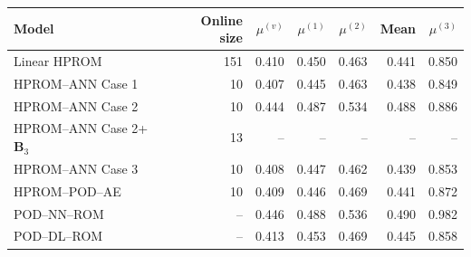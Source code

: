 \begin{tabular}{lr|rrrr|r}
\toprule
Model & Online size & $\mu^{(v)}$ & $\mu^{(1)}$ & $\mu^{(2)}$ & Mean & $\mu^{(3)}$ \\
\midrule
Linear HPROM & 151 & 0.410 & 0.450 & 0.463 & 0.441 & 0.850 \\
HPROM--ANN Case 1 & 10 & 0.407 & 0.445 & 0.463 & 0.438 & 0.849 \\
HPROM--ANN Case 2 & 10 & 0.444 & 0.487 & 0.534 & 0.488 & 0.886 \\
HPROM--ANN Case 2+$\mathbf B_3$ & 13 & -- & -- & -- & -- & -- \\
HPROM--ANN Case 3 & 10 & 0.408 & 0.447 & 0.462 & 0.439 & 0.853 \\
HPROM--POD--AE & 10 & 0.409 & 0.446 & 0.469 & 0.441 & 0.872 \\
\midrule
POD--NN--ROM & -- & 0.446 & 0.488 & 0.536 & 0.490 & 0.982 \\
POD--DL--ROM & -- & 0.413 & 0.453 & 0.469 & 0.445 & 0.858 \\
\bottomrule
\end{tabular}
